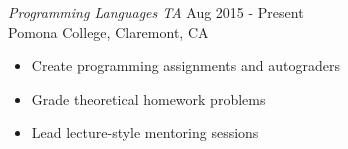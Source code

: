 {\sl Programming Languages TA} \hfill Aug 2015 - Present \\
Pomona College, Claremont, CA
\begin{itemize} \itemsep -2pt
  \item Create programming assignments and autograders
  \item Grade theoretical homework problems
  \item Lead lecture-style mentoring sessions
\end{itemize}
